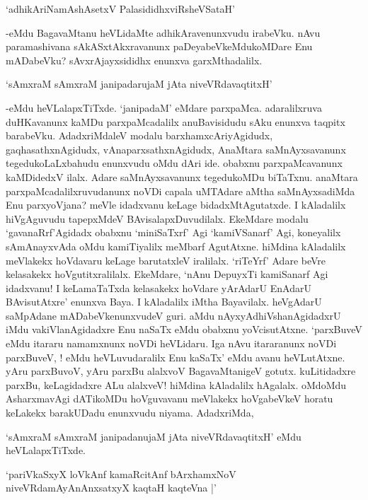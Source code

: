 \begin{shloka}
`adhikAriNamAshAsetxV PalasididhxviRsheVSataH'
\end{shloka}

-eMdu BagavaMtanu heVLidaMte adhikAravenunxvudu irabeVku. nAvu paramashivana sAkASxtAkxravanunx paDeyabeVkeMdukoMDare Enu mADabeVku? sAvxrAjayxsididhx enunxva garxMthadalilx.

\begin{shloka}
`sAmxraM sAmxraM janipadarujaM jAta niveVRdavaqtitxH'
\end{shloka}

-eMdu heVLalapxTiTxde. `janipadaM' eMdare parxpaMca. adaralilxruva duHKavanunx kaMDu parxpaMcadalilx anuBavisidudu sAku enunxva taqpitx barabeVku. AdadxriMdaleV modalu barxhamxcAriyAgidudx, gaqhasathxnAgidudx, vAnaparxsathxnAgidudx, AnaMtara saMnAyxsavanunx tegedukoLaLxbahudu enunxvudu oMdu dAri ide. obabxnu parxpaMcavanunx kaMDidedxV ilalx. Adare saMnAyxsavanunx tegedukoMDu biTaTxnu. anaMtara parxpaMcadalilxruvudanunx noVDi capala uMTAdare aMtha saMnAyxsadiMda Enu parxyoVjana? meVle idadxvanu keLage bidadxMtAgutatxde. I kAladalilx hiVgAguvudu tapepxMdeV BAvisalapxDuvudilalx. EkeMdare modalu `gavanaRrf'Agidadx obabxnu `miniSaTxrf' Agi `kamiVSanarf' Agi, koneyalilx sAmAnayxvAda oMdu kamiTiyalilx meMbarf AgutAtxne. hiMdina kAladalilx meVlakekx hoVdavaru keLage barutatxleV iralilalx. `riTeYrf' Adare beVre kelasakekx hoVgutitxralilalx. EkeMdare, `nAnu DepuyxTi kamiSanarf Agi idadxvanu! I keLamaTaTxda kelasakekx hoVdare yArAdarU EnAdarU BAvisutAtxre' enunxva Baya. I kAladalilx iMtha Bayavilalx. heVgAdarU saMpAdane mADabeVkenunxvudeV guri. aMdu nAyxyAdhiVshanAgidadxrU iMdu vakiVlanAgidadxre Enu naSaTx eMdu obabxnu yoVcisutAtxne. `parxBuveV eMdu itararu namamxnunx noVDi heVLidaru. Iga nAvu itararanunx noVDi parxBuveV, ! eMdu heVLuvudaralilx Enu kaSaTx' eMdu avanu heVLutAtxne. yAru parxBuvoV, yAru parxBu alalxvoV BagavaMtanigeV gotutx. kuLitidadxre parxBu, keLagidadxre ALu alalxveV! hiMdina kAladalilx hAgalalx. oMdoMdu AsharxmavAgi dATikoMDu hoVguvavanu meVlakekx hoVgabeVkeV horatu keLakekx barakUDadu enunxvudu niyama. AdadxriMda, 

`sAmxraM sAmxraM janipadanujaM jAta niveVRdavaqtitxH' eMdu heVLalapxTiTxde.

\begin{shloka}
`pariVkaSxyX loVkAnf kamaRcitAnf bArxhamxNoV\\
niveVRdamAyAnAnxsatxyX kaqtaH kaqteVna |'
\end{shloka}

